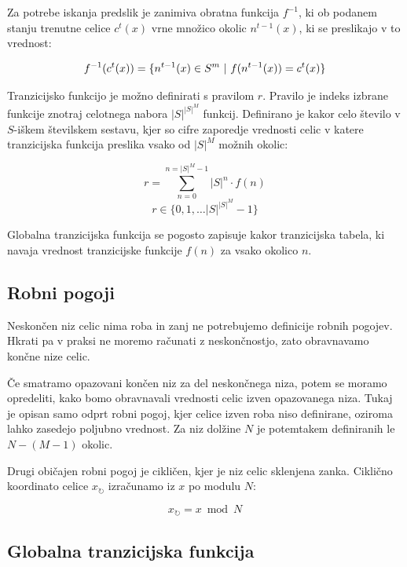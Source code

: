 \documentclass[12pt,a4paper,openany,twoside]{book}
\begin{document}
Za potrebe iskanja predslik je zanimiva obratna funkcija \(f^{-1}\), ki ob
podanem stanju trenutne celice \(c^{t}(x)\) vrne množico okolic \(n^{t-1}(x)\),
ki se preslikajo v to vrednost:

\begin{equation}
f^{-1}(c^{t}(x)) = \{ n^{t-1}(x) \in S^m \ \arrowvert \ f(n^{t-1}(x)) = c^{t}(x) \}
\end{equation}

Tranzicijsko funkcijo je možno definirati s pravilom  \(r\).
Pravilo je indeks izbrane funkcije znotraj celotnega nabora \(|S|^{|S|^M}\) funkcij.
Definirano je kakor celo število v \(S\)-iškem številskem sestavu,
kjer so cifre zaporedje vrednosti celic v katere tranzicijska funkcija
preslika vsako od \(|S|^M\) možnih okolic:

\begin{equation}
r = \sum_{n=0}^{n=|S|^M-1} |S|^n \cdot f(n)
\end{equation}
\begin{equation}
r \in \{0, 1, \ldots |S|^{|S|^M}-1\}
\end{equation}

Globalna tranzicijska funkcija se pogosto zapisuje kakor tranzicijska tabela,
ki navaja vrednost tranzicijske funkcije \(f(n)\) za vsako okolico \(n\).

\subsection{Robni pogoji}

Neskončen niz celic nima roba in zanj ne potrebujemo definicije robnih pogojev.
Hkrati pa v praksi ne moremo računati z neskončnostjo,
zato obravnavamo končne nize celic.

Če smatramo opazovani končen niz za del neskončnega niza,
potem se moramo opredeliti, kako bomo obravnavali vrednosti celic izven opazovanega niza.
Tukaj je opisan samo odprt robni pogoj, kjer celice izven roba niso definirane,
oziroma lahko zasedejo poljubno vrednost.
Za niz dolžine \(N\) je potemtakem definiranih le \(N-(M-1)\) okolic.

Drugi običajen robni pogoj je cikličen, kjer je niz celic sklenjena zanka.
Ciklično koordinato celice \(x_{\circlearrowright}\) izračunamo iz \(x\) po modulu \(N\):

\begin{equation}
x_{\circlearrowright} = x \bmod N
\end{equation}

\subsection{Globalna tranzicijska funkcija}
\end{document}
